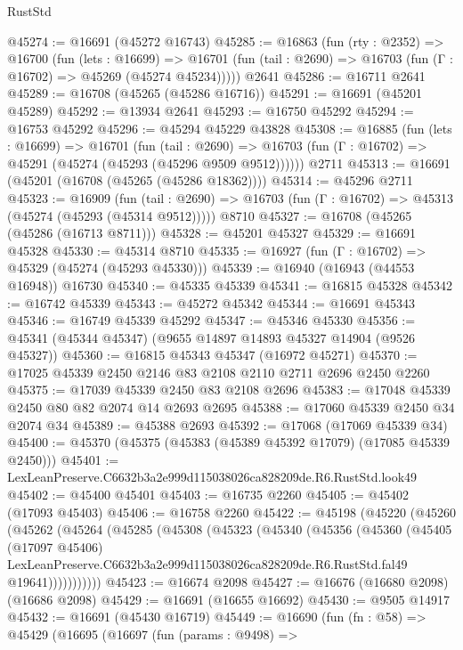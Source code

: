 \begin{lexlean}{RustStd}
\begin{coremodule}
@45274 := @16691 (@45272 @16743)
@45285 := @16863
    (fun (rty : @2352) =>
    @16700
      (fun (lets : @16699) =>
      @16701 (fun (tail : @2690) => @16703 (fun (Γ : @16702) => @45269 (@45274 @45234)))))
    @2641
@45286 := @16711 @2641
@45289 := @16708 (@45265 (@45286 @16716))
@45291 := @16691 (@45201 @45289)
@45292 := @13934 @2641
@45293 := @16750 @45292
@45294 := @16753 @45292
@45296 := @45294 @45229 @43828
@45308 := @16885
    (fun (lets : @16699) =>
    @16701
      (fun (tail : @2690) =>
      @16703 (fun (Γ : @16702) => @45291 (@45274 (@45293 (@45296 @9509 @9512))))))
    @2711
@45313 := @16691 (@45201 (@16708 (@45265 (@45286 @18362))))
@45314 := @45296 @2711
@45323 := @16909
    (fun (tail : @2690) => @16703 (fun (Γ : @16702) => @45313 (@45274 (@45293 (@45314 @9512)))))
    @8710
@45327 := @16708 (@45265 (@45286 (@16713 @8711)))
@45328 := @45201 @45327
@45329 := @16691 @45328
@45330 := @45314 @8710
@45335 := @16927 (fun (Γ : @16702) => @45329 (@45274 (@45293 @45330)))
@45339 := @16940 (@16943 (@44553 @16948)) @16730
@45340 := @45335 @45339
@45341 := @16815 @45328
@45342 := @16742 @45339
@45343 := @45272 @45342
@45344 := @16691 @45343
@45346 := @16749 @45339 @45292
@45347 := @45346 @45330
@45356 := @45341 (@45344 @45347) (@9655 @14897 @14893 @45327 @14904 (@9526 @45327))
@45360 := @16815 @45343 @45347 (@16972 @45271)
@45370 := @17025 @45339 @2450 @2146 @83 @2108 @2110 @2711 @2696 @2450 @2260
@45375 := @17039 @45339 @2450 @83 @2108 @2696
@45383 := @17048 @45339 @2450 @80 @82 @2074 @14 @2693 @2695
@45388 := @17060 @45339 @2450 @34 @2074 @34
@45389 := @45388 @2693
@45392 := @17068 (@17069 @45339 @34)
@45400 := @45370 (@45375 (@45383 (@45389 @45392 @17079) (@17085 @45339 @2450)))
@45401 := LexLeanPreserve.C6632b3a2e999d115038026ca828209de.R6.RustStd.look49
@45402 := @45400 @45401
@45403 := @16735 @2260
@45405 := @45402 (@17093 @45403)
@45406 := @16758 @2260
@45422 := @45198
    (@45220
      (@45260
        (@45262
          (@45264
            (@45285
              (@45308
                (@45323
                  (@45340
                    (@45356
                      (@45360
                        (@45405
                          (@17097 @45406)
                          LexLeanPreserve.C6632b3a2e999d115038026ca828209de.R6.RustStd.fal49
                          @19641)))))))))))
@45423 := @16674 @2098
@45427 := @16676 (@16680 @2098) (@16686 @2098)
@45429 := @16691 (@16655 @16692)
@45430 := @9505 @14917
@45432 := @16691 (@45430 @16719)
@45449 := @16690
    (fun (fn : @58) =>
    @45429
      (@16695
        (@16697
          (fun (params : @9498) =>

\end{coremodule}
\end{lexlean}
